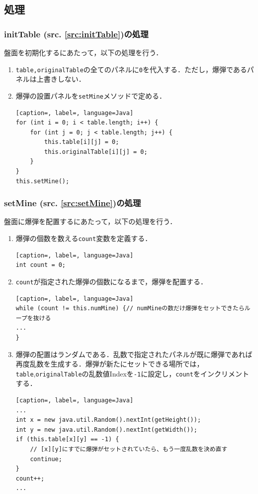\documentclass[a4j,11pt]{jsarticle}
\newcommand{\srcref}[1]{src. \ref{#1}}
\newcommand{\met}[1]{\ttfamily #1 \normalfont (\srcref{src:#1})の処理}
\begin{document}
\subsection{処理}
\subsubsection*{\met{initTable}}
盤面を初期化するにあたって，以下の処理を行う．
\begin{enumerate}
    \item \verb|table,originalTable|の全てのパネルに\verb|0|を代入する．ただし，爆弾であるパネルは上書きしない．
    \item 爆弾の設置パネルを\verb|setMine|メソッドで定める．
          \begin{lstlisting}[caption=, label=, language=Java]
for (int i = 0; i < table.length; i++) {
    for (int j = 0; j < table.length; j++) {
        this.table[i][j] = 0;
        this.originalTable[i][j] = 0;
    }
}
this.setMine();
            \end{lstlisting}
\end{enumerate}
\subsubsection*{\met{setMine}}
盤面に爆弾を配置するにあたって，以下の処理を行う．
\begin{enumerate}
    \item 爆弾の個数を数える\verb|count|変数を定義する．
          \begin{lstlisting}[caption=, label=, language=Java]
int count = 0;
\end{lstlisting}
    \item \verb|count|が指定された爆弾の個数になるまで，爆弾を配置する．
          \begin{lstlisting}[caption=, label=, language=Java]
while (count != this.numMine) {// numMineの数だけ爆弾をセットできたらループを抜ける
...
}
    \end{lstlisting}
    \item 爆弾の配置はランダムである．乱数で指定されたパネルが既に爆弾であれば再度乱数を生成する．爆弾が新たにセットできる場所では，\verb|table|,\verb|originalTable|の乱数値Indexを\verb|-1|に設定し，\verb|count|をインクリメントする．
          \begin{lstlisting}[caption=, label=, language=Java]
...
int x = new java.util.Random().nextInt(getHeight());
int y = new java.util.Random().nextInt(getWidth());
if (this.table[x][y] == -1) {
    // [x][y]にすでに爆弾がセットされていたら、もう一度乱数を決め直す
    continue;
}
count++;
...
    \end{lstlisting}
\end{enumerate}
\newpage
\end{document}
